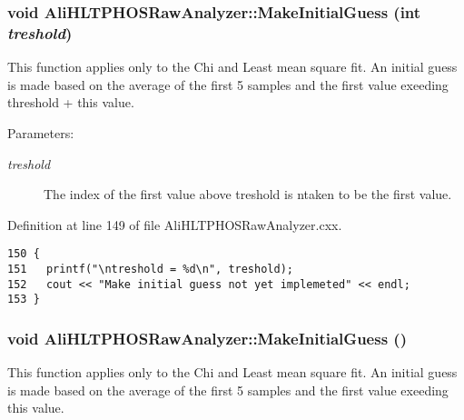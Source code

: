 \subsubsection{\setlength{\rightskip}{0pt plus 5cm}void Ali\-HLTPHOSRaw\-Analyzer::Make\-Initial\-Guess (int {\em treshold})\hspace{0.3cm}{\tt  [inherited]}}\label{classAliHLTPHOSRawAnalyzer_AliHLTPHOSRawAnalyzerPeakFindera16}


This function applies only to the Chi and Least mean square fit. An initial guess is made based on the average of the first 5 samples and the first value exeeding threshold + this value. \begin{Desc}
\item[Parameters:]
\begin{description}
\item[{\em treshold}]The index of the first value above treshold is ntaken to be the first value. \end{description}
\end{Desc}


Definition at line 149 of file Ali\-HLTPHOSRaw\-Analyzer.cxx.

\footnotesize\begin{verbatim}150 {
151   printf("\ntreshold = %d\n", treshold);
152   cout << "Make initial guess not yet implemeted" << endl;  
153 }
\end{verbatim}\normalsize 


\subsubsection{\setlength{\rightskip}{0pt plus 5cm}void Ali\-HLTPHOSRaw\-Analyzer::Make\-Initial\-Guess ()\hspace{0.3cm}{\tt  [inherited]}}\label{classAliHLTPHOSRawAnalyzer_AliHLTPHOSRawAnalyzerPeakFindera15}


This function applies only to the Chi and Least mean square fit. An initial guess is made based on the average of the first 5 samples and the first value exeeding this value. 

